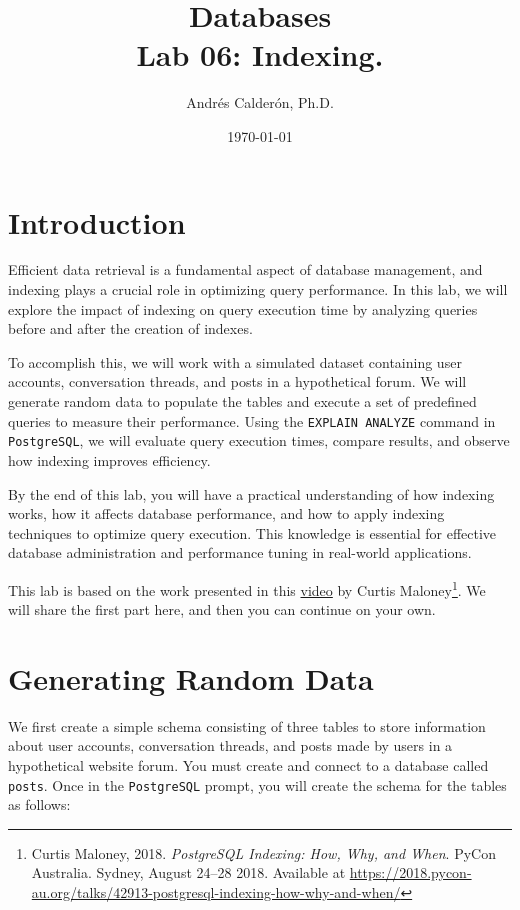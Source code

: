 \documentclass{article}
\title{Databases \\ Lab 06: Indexing.}
\author{Andrés Calderón, Ph.D.}
\date{\today}
\begin{document}
\maketitle

\section{Introduction}

Efficient data retrieval is a fundamental aspect of database management, and indexing plays a crucial role in optimizing query performance. In this lab, we will explore the impact of indexing on query execution time by analyzing queries before and after the creation of indexes.

To accomplish this, we will work with a simulated dataset containing user accounts, conversation threads, and posts in a hypothetical forum. We will generate random data to populate the tables and execute a set of predefined queries to measure their performance. Using the \texttt{EXPLAIN ANALYZE} command in \texttt{PostgreSQL}, we will evaluate query execution times, compare results, and observe how indexing improves efficiency.

By the end of this lab, you will have a practical understanding of how indexing works, how it affects database performance, and how to apply indexing techniques to optimize query execution. This knowledge is essential for effective database administration and performance tuning in real-world applications.

This lab is based on the work presented in this \href{https://youtu.be/clrtT_4WBAw?si=Q5Rmt7YVsykuS715}{video} by Curtis Maloney\footnote{Curtis Maloney, 2018. \textit{PostgreSQL Indexing: How, Why, and When}. PyCon Australia. Sydney, August 24–28 2018. Available at \url{https://2018.pycon-au.org/talks/42913-postgresql-indexing-how-why-and-when/}}. We will share the first part here, and then you can continue on your own.

\section{Generating Random Data}
We first create a simple schema consisting of three tables to store information about user accounts, conversation threads, and posts made by users in a hypothetical website forum. You must create and connect to a database called \texttt{posts}. Once in the \texttt{PostgreSQL} prompt, you will create the schema for the tables as follows:
\end{document}
